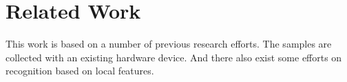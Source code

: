 \chapter{Related Work\label{ch:pastwork}}

This work is based on a number of previous research efforts. The samples are collected with an existing hardware device. And there also exist some efforts on recognition based on local features.




